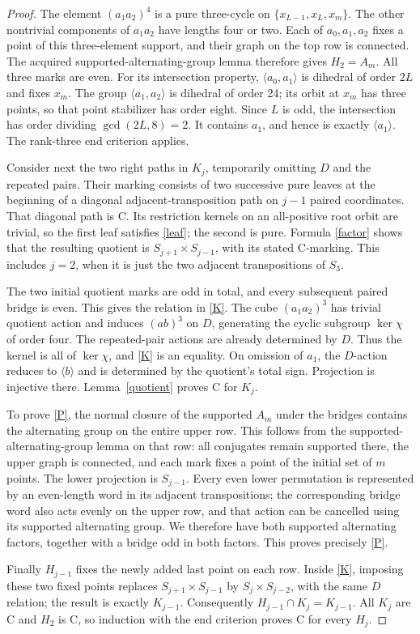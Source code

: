 \documentclass[11pt]{article}
\newcommand{\gen}[1]{\langle#1\rangle}
\begin{document}
\begin{proof}
The element $(a_1a_2)^4$ is a pure three-cycle on
$\{x_{L-1},x_L,x_m\}$. The other nontrivial components of
$a_1a_2$ have lengths four or two. Each of $a_0,a_1,a_2$ fixes
a point of this three-element support, and their graph on the top
row is connected. The acquired supported-alternating-group lemma
therefore gives $H_2=A_m$. All three marks are even. For its
intersection property, $\gen{a_0,a_1}$ is dihedral of order $2L$
and fixes $x_m$. The group $\gen{a_1,a_2}$ is dihedral of order
24; its orbit at $x_m$ has three points, so that point stabilizer
has order eight. Since $L$ is odd, the intersection has order
dividing $\gcd(2L,8)=2$. It contains $a_1$, and hence is exactly
$\gen{a_1}$. The rank-three end criterion applies.

Consider next the two right paths in $K_j$, temporarily omitting
$D$ and the repeated pairs. Their marking consists of two successive
pure leaves at the beginning of a diagonal adjacent-transposition
path on $j-1$ paired coordinates. That diagonal path is C. Its
restriction kernels on an all-positive root orbit are trivial, so
the first leaf satisfies \eqref{leaf}; the second is pure.
Formula \eqref{factor} shows that the resulting quotient is
$S_{j+1}\times S_{j-1}$, with its stated C-marking. This includes
$j=2$, when it is just the two adjacent transpositions of $S_3$.

The two initial quotient marks are odd in total, and every subsequent
paired bridge is even. This gives the relation in \eqref{K}.
The cube $(a_1a_2)^3$ has trivial quotient action and induces
$(ab)^3$ on $D$, generating the cyclic subgroup $\ker\chi$ of
order four. The repeated-pair actions are already determined by
$D$. Thus the kernel is all of $\ker\chi$, and \eqref{K} is
an equality. On omission of $a_1$, the $D$-action reduces to
$\gen b$ and is determined by the quotient's total sign.
Projection is injective there. Lemma~\ref{quotient} proves C for
$K_j$.

To prove \eqref{P}, the normal closure of the supported $A_m$
under the bridges contains the alternating group on the entire
upper row. This follows from the supported-alternating-group lemma
on that row: all conjugates remain supported there, the upper
graph is connected, and each mark fixes a point of the initial
set of $m$ points. The lower projection is $S_{j-1}$. Every even
lower permutation is represented by an even-length word in its
adjacent transpositions; the corresponding bridge word also acts
evenly on the upper row, and that action can be cancelled using
its supported alternating group. We therefore have both supported
alternating factors, together with a bridge odd in both factors.
This proves precisely \eqref{P}.

Finally $H_{j-1}$ fixes the newly added last point on each row.
Inside \eqref{K}, imposing these two fixed points replaces
$S_{j+1}\times S_{j-1}$ by $S_j\times S_{j-2}$, with the same
$D$ relation; the result is exactly $K_{j-1}$. Consequently
$H_{j-1}\cap K_j=K_{j-1}$. All $K_j$ are C and $H_2$ is C,
so induction with the end criterion proves C for every $H_j$.
\end{proof}
\end{document}
